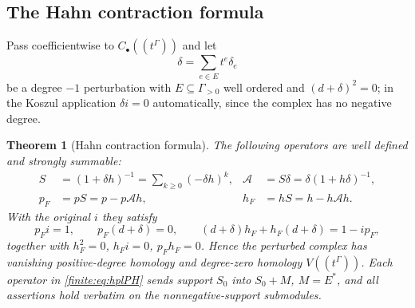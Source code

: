 \documentclass[11pt,letterpaper]{article}
\newtheorem{theorem}{Theorem}[section]
\theoremstyle{definition}
\theoremstyle{remark}
\numberwithin{equation}{section}
\begin{document}
\subsection{The Hahn contraction formula}
\label{finite:sec:hpl}

Pass coefficientwise to $C_\bullet((t^\Gamma))$ and let
\[
 \delta=\sum_{e\in E}t^e\delta_e
\]
be a degree $-1$ perturbation with $E\subseteq\Gamma_{>0}$ well ordered and $(d+\delta)^2=0$; in the Koszul application $\delta i=0$ automatically, since the complex has no negative degree.

\begin{theorem}[Hahn contraction formula]
\label{finite:thm:hpl}
The following operators are well defined and strongly summable:
\begin{align}
 S&=(1+\delta h)^{-1}=\sum_{k\geq0}(-\delta h)^k,
 &\mathcal A&=S\delta=\delta(1+h\delta)^{-1},
 \label{finite:eq:hplS}\\
 p_F&=pS=p-p\mathcal Ah,
 &h_F&=hS=h-h\mathcal Ah.
 \label{finite:eq:hplPH}
\end{align}
With the original $i$ they satisfy
\begin{equation}\label{finite:eq:hplidentity}
 p_Fi=1,\qquad p_F(d+\delta)=0,\qquad
 (d+\delta)h_F+h_F(d+\delta)=1-ip_F,
\end{equation}
together with $h_F^2=0$, $h_Fi=0$, $p_Fh_F=0$. Hence the perturbed complex has vanishing positive-degree homology and degree-zero homology $V((t^\Gamma))$. Each operator in \eqref{finite:eq:hplPH} sends support $S_0$ into $S_0+M$, $M=E^*$, and all assertions hold verbatim on the nonnegative-support submodules.
\end{theorem}
\end{document}

